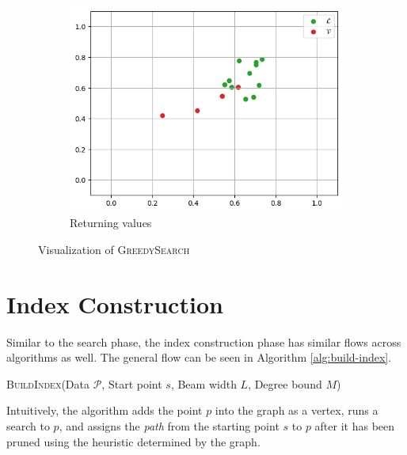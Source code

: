 \begin{figure}[ht]
\begin{subfigure}{0.31\textwidth}
        \includegraphics[width=\textwidth]{images/greedy-search-final}
        \caption{Returning values}
        \label{fig:gs-return}
    \end{subfigure}
    \hfill
    \caption{Visualization of \textsc{GreedySearch}}
    \label{fig:greedy-viz}
\end{figure}

\section{Index Construction}

Similar to the search phase, the index construction phase has similar flows across algorithms as well. The general flow can be seen in Algorithm \ref{alg:build-index}.

\begin{algorithm}[H]
    \caption{\textsc{BuildIndex}(Data \(\mathcal{P}\), Start point \(s\), Beam width \(L\), Degree bound \(M\))}
    \label{alg:build-index}
    \begin{algorithmic}[1]
             
        \EndFor
    \end{algorithmic}
\end{algorithm}

Intuitively, the algorithm adds the point \(p\) into the graph as a vertex, runs a search to \(p\), and assigns the \textit{path} from the starting point \(s\) to \(p\) after it has been pruned using the heuristic determined by the graph.

